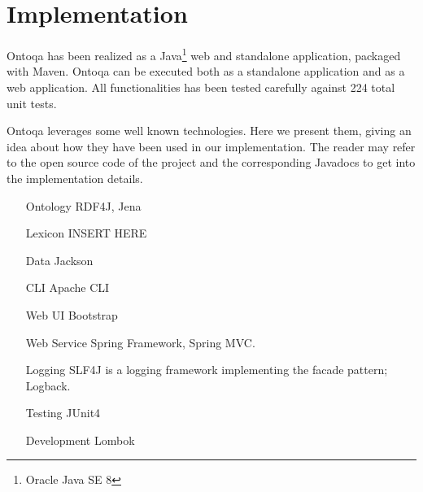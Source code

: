 \section{Implementation}
\label{sec:implementation}

Ontoqa has been realized as a Java\footnote{Oracle Java SE 8} web and standalone application, packaged with Maven.
%
Ontoqa can be executed both as a standalone application and as a web application.
%
All functionalities has been tested carefully against 224 total unit tests.

Ontoqa leverages some well known technologies. Here we present them, giving an idea about how they have been used in our implementation. The reader may refer to the open source code of the project and the corresponding Javadocs to get into the implementation details.


\begin{itemize}
	\item[Ontology] RDF4J, Jena
	
	\item[Lexicon] INSERT HERE	
	
	\item[Data] Jackson
	
	\item[CLI] Apache CLI
	
	\item[Web UI] Bootstrap
	
	\item[Web Service] Spring Framework, Spring MVC.
	
	\item[Logging] 
	SLF4J is a logging framework implementing the facade pattern;
	Logback.
	
	\item[Testing] JUnit4
	
	\item[Development] Lombok
\end{itemize}